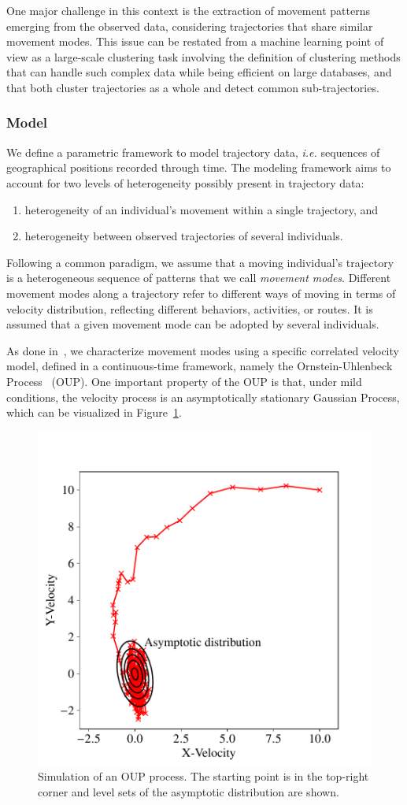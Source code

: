 One major challenge in this context is the extraction of movement patterns
emerging from the observed data, considering trajectories that share similar
movement modes.
This issue can be restated from a machine learning point of view as a
large-scale clustering task involving the definition of clustering methods
that can handle such complex data while being efficient on large databases,
and that both cluster trajectories as a whole and detect common
sub-trajectories.

\subsubsection{Model}

We define a parametric framework to model trajectory data,
\emph{i.e.} sequences of geographical positions recorded through time.
The modeling framework aims to account for two levels of heterogeneity possibly
present in trajectory data:

\begin{enumerate}
\item heterogeneity of an individual's movement within a single trajectory, and
\item heterogeneity between observed trajectories of several individuals.
\end{enumerate}

Following a common paradigm, we assume that a moving individual's trajectory
is a heterogeneous sequence of patterns that we call \emph{movement modes}.
Different movement modes along a trajectory refer to different ways of moving
in terms of velocity distribution, reflecting different behaviors, activities,
or routes.
It is assumed that a given movement mode can be adopted by several individuals.

As done in~\cite{gurarie2017correlated}, we characterize
movement modes using a specific correlated velocity model, defined in a
continuous-time framework, namely the Ornstein-Uhlenbeck
Process~\cite{uhlenbeck1930theory} (OUP).
One important property of the OUP is that, under mild conditions,
the velocity process is an asymptotically stationary Gaussian Process, which
can be visualized in Figure~\ref{fig:oup}.

\begin{figure}
\centering
\includegraphics[width=.5\textwidth]{fig/oup}
\caption{Simulation of an OUP process. The starting point is in the
top-right corner and level sets of the asymptotic distribution are shown.
\label{fig:oup}}
\end{figure}

